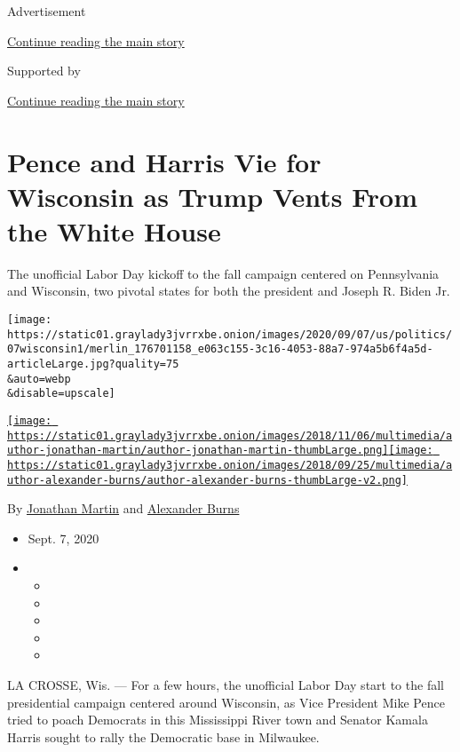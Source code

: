 Advertisement

\protect\hyperlink{after-top}{Continue reading the main story}

Supported by

\protect\hyperlink{after-sponsor}{Continue reading the main story}

\hypertarget{pence-and-harris-vie-for-wisconsin-as-trump-vents-from-the-white-house}{%
\section{Pence and Harris Vie for Wisconsin as Trump Vents From the
White
House}\label{pence-and-harris-vie-for-wisconsin-as-trump-vents-from-the-white-house}}

The unofficial Labor Day kickoff to the fall campaign centered on
Pennsylvania and Wisconsin, two pivotal states for both the president
and Joseph R. Biden Jr.

\texttt{[image: https://static01.graylady3jvrrxbe.onion/images/2020/09/07/us/politics/07wisconsin1/merlin\_176701158\_e063c155-3c16-4053-88a7-974a5b6f4a5d-articleLarge.jpg?quality=75\\\&auto=webp\\\&disable=upscale]}

\href{https://www.nytimes3xbfgragh.onion/by/jonathan-martin}{\texttt{[image: https://static01.graylady3jvrrxbe.onion/images/2018/11/06/multimedia/author-jonathan-martin/author-jonathan-martin-thumbLarge.png]}}\href{https://www.nytimes3xbfgragh.onion/by/alexander-burns}{\texttt{[image: https://static01.graylady3jvrrxbe.onion/images/2018/09/25/multimedia/author-alexander-burns/author-alexander-burns-thumbLarge-v2.png]}}

By \href{https://www.nytimes3xbfgragh.onion/by/jonathan-martin}{Jonathan
Martin} and
\href{https://www.nytimes3xbfgragh.onion/by/alexander-burns}{Alexander
Burns}

\begin{itemize}
\item
  Sept. 7, 2020
\item
  \begin{itemize}
  \item
  \item
  \item
  \item
  \item
  \end{itemize}
\end{itemize}

LA CROSSE, Wis. --- For a few hours, the unofficial Labor Day start to
the fall presidential campaign centered around Wisconsin, as Vice
President Mike Pence tried to poach Democrats in this Mississippi River
town and Senator Kamala Harris sought to rally the Democratic base in
Milwaukee.

